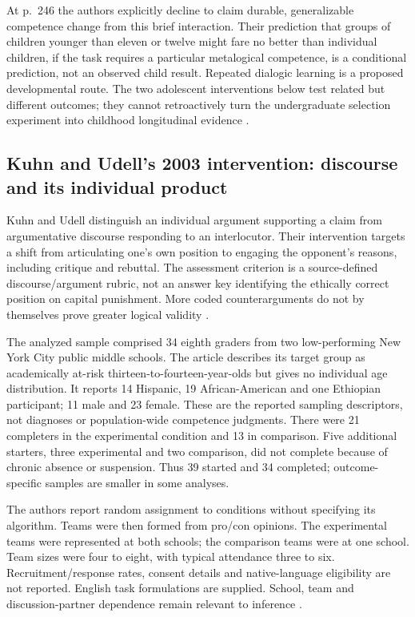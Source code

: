 At p.~246 the authors explicitly decline to claim durable, generalizable
competence change from this brief interaction. Their prediction that groups
of children younger than eleven or twelve might fare no better than individual
children, if the task requires a particular metalogical competence, is a
conditional prediction, not an observed child result. Repeated dialogic
learning is a proposed developmental route. The two adolescent interventions
below test related but different outcomes; they cannot retroactively turn
the undergraduate selection experiment into childhood longitudinal evidence
\cite[pp.~242--246]{MoshmanGeil1998CollaborativeReasoning}.

\subsection{Kuhn and Udell's 2003 intervention: discourse and its individual product}
\label{sec:p19-r151-kuhn-udell}

Kuhn and Udell distinguish an individual argument supporting a claim from
argumentative discourse responding to an interlocutor. Their intervention
targets a shift from articulating one's own position to engaging the
opponent's reasons, including critique and rebuttal. The assessment criterion
is a source-defined discourse/argument rubric, not an answer key identifying
the ethically correct position on capital punishment. More coded
counterarguments do not by themselves prove greater logical validity
\cite[pp.~1245--1248]{KuhnUdell2003Development}.

The analyzed sample comprised 34 eighth graders from two low-performing
New York City public middle schools. The article describes its target group
as academically at-risk thirteen-to-fourteen-year-olds but gives no individual
age distribution. It reports 14 Hispanic, 19 African-American and one
Ethiopian participant; 11 male and 23 female. These are the reported
sampling descriptors, not diagnoses or population-wide competence judgments.
There were 21 completers in the experimental condition and 13 in comparison.
Five additional starters, three experimental and two comparison, did not
complete because of chronic absence or suspension. Thus 39 started and
34 completed; outcome-specific samples are smaller in some analyses.

The authors report random assignment to conditions without specifying its
algorithm. Teams were then formed from pro/con opinions. The experimental
teams were represented at both schools; the comparison teams were at one
school. Team sizes were four to eight, with typical attendance three to
six. Recruitment/response rates, consent details and native-language
eligibility are not reported. English task formulations are supplied.
School, team and discussion-partner dependence remain relevant to inference
\cite[pp.~1247--1250]{KuhnUdell2003Development}.

